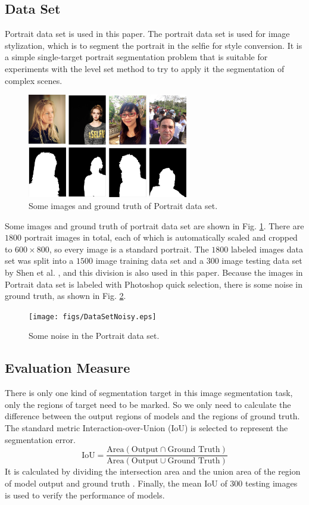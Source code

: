 \subsection{Data Set}
Portrait data set is used in this paper. The portrait data set is used for image stylization, which is to segment the portrait in the selfie for style conversion. It is a simple single-target portrait segmentation problem that is suitable for experiments with the level set method to try to apply it the segmentation of complex scenes.
\begin{figure}[h]
    \centering
    \includegraphics[width = 7cm]{figs/PortraitDataSet.jpg}
    \caption{Some images and ground truth of Portrait data set.}\label{fig: Some images and ground truth of Portrait data set}
\end{figure}
Some images and ground truth of portrait data set are shown in Fig. \ref{fig: Some images and ground truth of Portrait data set}. There are $1800$ portrait images in total, each of which is automatically scaled and cropped to $600\times800$, so every image is a standard portrait. The $1800$ labeled images data set was split into a $1500$ image training data set and a $300$ image testing data set by Shen et al. \cite{FCN:segmentation:shen2016automatic}, and this division is also used in this paper. Because the images in Portrait data set is labeled with Photoshop quick selection, there is some noise in ground truth, as shown in Fig. \ref{fig: Some noise in the Portrait data set}.
\begin{figure}[h]
    \centering
    \texttt{[image: figs/DataSetNoisy.eps]}
    \caption{Some noise in the Portrait data set.}\label{fig: Some noise in the Portrait data set}
\end{figure}

\subsection{Evaluation Measure}
There is only one kind of segmentation target in this image segmentation task, only the regions of target need to be marked. So we only need to calculate the difference between the output regions of models and the regions of ground truth. The standard metric Interaction-over-Union (IoU) is selected to represent the segmentation error.
\begin{equation*}
    \text{IoU} = \frac{\text{Area}(\text{Output} \cap \text{Ground Truth})}{\text{Area}(\text{Output} \cup \text{Ground Truth})}
\end{equation*}
It is calculated by dividing the intersection area and the union area of the region of model output and ground truth . Finally, the mean IoU of $300$ testing images is used to verify the performance of models.
